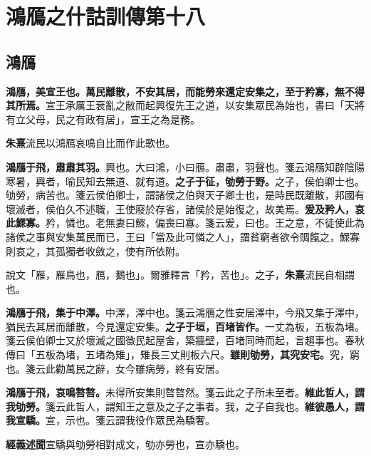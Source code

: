 \chapter{鴻鴈之什詁訓傳第十八}

\section{鴻鴈}


\textbf{鴻鴈，美宣王也。萬民離散，不安其居，而能勞來還定安集之，至于矜寡，無不得其所焉。}{\footnotesize 宣王承厲王衰亂之敝而起興復先王之道，以安集眾民為始也，書曰「天將有立父母，民之有政有居」，宣王之為是務。}

\begin{quoting}\textbf{朱熹}流民以鴻鴈哀鳴自比而作此歌也。\end{quoting}

\textbf{鴻鴈于飛，肅肅其羽。}{\footnotesize 興也。大曰鴻，小曰鴈。肅肅，羽聲也。箋云鴻鴈知辟陰陽寒暑，興者，喻民知去無道、就有道。}\textbf{之子于征，劬勞于野。}{\footnotesize 之子，侯伯卿士也。劬勞，病苦也。箋云侯伯卿士，謂諸侯之伯與天子卿士也，是時民既離散，邦國有壞滅者，侯伯久不述職，王使廢於存省，諸侯於是始復之，故美焉。}\textbf{爰及矜人，哀此鰥寡。}{\footnotesize 矜，憐也。老無妻曰鰥，偏喪曰寡。箋云爰，曰也。王之意，不徒使此為諸侯之事與安集萬民而已，王曰「當及此可憐之人」，謂貧窮者欲令賙餼之，鰥寡則哀之，其孤獨者收斂之，使有所依附。}

\begin{quoting}說文「雁，雁鳥也，鴈，鵝也」。爾雅釋言「矜，苦也」。之子，\textbf{朱熹}流民自相謂也。\end{quoting}

\textbf{鴻鴈于飛，集于中澤。}{\footnotesize 中澤，澤中也。箋云鴻鴈之性安居澤中，今飛又集于澤中，猶民去其居而離散，今見還定安集。}\textbf{之子于垣，百堵皆作。}{\footnotesize 一丈為板，五板為堵。箋云侯伯卿士又於壞滅之國徵民起屋舍，築牆壁，百堵同時而起，言趨事也。春秋傳曰「五板為堵，五堵為雉」，雉長三丈則板六尺。}\textbf{雖則劬勞，其究安宅。}{\footnotesize 究，窮也。箋云此勸萬民之辭，女今雖病勞，終有安居。}

\textbf{鴻鴈于飛，哀鳴嗸嗸。}{\footnotesize 未得所安集則嗸嗸然。箋云此之子所未至者。}\textbf{維此哲人，謂我劬勞。}{\footnotesize 箋云此哲人，謂知王之意及之子之事者。我，之子自我也。}\textbf{維彼愚人，謂我宣驕。}{\footnotesize 宣，示也。箋云謂我役作眾民為驕奢。}

\begin{quoting}\textbf{經義述聞}宣驕與劬勞相對成文，劬亦勞也，宣亦驕也。\end{quoting}

